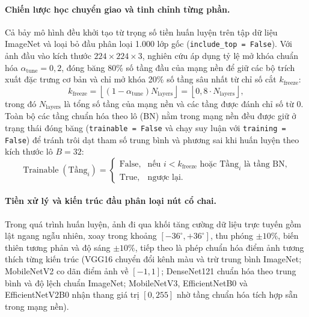 \paragraph{Chiến lược học chuyển giao và tinh chỉnh từng phần.}
Cả bảy mô hình đều khởi tạo từ trọng số tiền huấn luyện trên tập dữ liệu ImageNet \cite{deng2009imagenet} và loại bỏ đầu phân loại 1.000 lớp gốc (\texttt{include\_top = False}). Với ảnh đầu vào kích thước $224\times 224\times 3$, nghiên cứu áp dụng tỷ lệ mở khóa chuẩn hóa $\alpha_{\mathrm{tune}} = 0{,}2$, đóng băng 80\% số tầng đầu của mạng nền để giữ các bộ trích xuất đặc trưng cơ bản và chỉ mở khóa 20\% số tầng sâu nhất từ chỉ số cắt $k_{\mathrm{freeze}}$:
\begin{equation}
    k_{\mathrm{freeze}} = \left\lfloor (1 - \alpha_{\mathrm{tune}}) N_{\mathrm{layers}} \right\rfloor = \left\lfloor 0{,}8 \cdot N_{\mathrm{layers}} \right\rfloor,
    \label{eq:freeze-cutoff}
\end{equation}
trong đó $N_{\mathrm{layers}}$ là tổng số tầng của mạng nền và các tầng được đánh chỉ số từ $0$. Toàn bộ các tầng chuẩn hóa theo lô (BN) nằm trong mạng nền đều được giữ ở trạng thái đóng băng (\texttt{trainable = False} và chạy suy luận với \texttt{training = False}) để tránh trôi dạt tham số trung bình và phương sai khi huấn luyện theo kích thước lô $B = 32$:
\begin{equation}
    \operatorname{Trainable}(\text{Tầng}_i) =
    \begin{cases}
        \text{False}, & \text{nếu } i < k_{\mathrm{freeze}} \text{ hoặc } \text{Tầng}_i \text{ là tầng BN},\\
        \text{True}, & \text{ngược lại}.
    \end{cases}
    \label{eq:bn-freeze-rule}
\end{equation}

\paragraph{Tiền xử lý và kiến trúc đầu phân loại nút cổ chai.}
Trong quá trình huấn luyện, ảnh đi qua khối tăng cường dữ liệu trực tuyến gồm lật ngang ngẫu nhiên, xoay trong khoảng $[-36^\circ, +36^\circ]$, thu phóng $\pm 10\%$, biến thiên tương phản và độ sáng $\pm 10\%$, tiếp theo là phép chuẩn hóa điểm ảnh tương thích từng kiến trúc (VGG16 chuyển đổi kênh màu và trừ trung bình ImageNet; MobileNetV2 co dãn điểm ảnh về $[-1, 1]$; DenseNet121 chuẩn hóa theo trung bình và độ lệch chuẩn ImageNet; MobileNetV3, EfficientNetB0 và EfficientNetV2B0 nhận thang giá trị $[0, 255]$ nhờ tầng chuẩn hóa tích hợp sẵn trong mạng nền).

